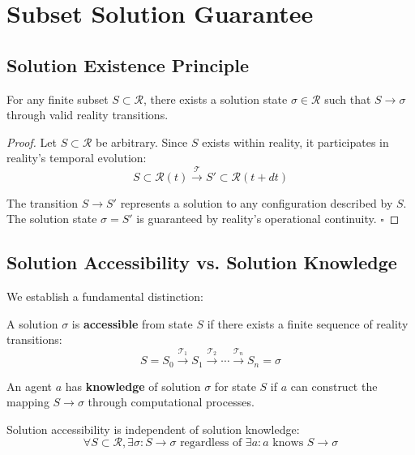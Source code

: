\documentclass{article}
\begin{document}
\section{Subset Solution Guarantee}

\subsection{Solution Existence Principle}
\begin{theorem}
For any finite subset $S \subset \mathcal{R}$, there exists a solution state $\sigma \in \mathcal{R}$ such that $S \rightarrow \sigma$ through valid reality transitions.
\end{theorem}

\begin{proof}
Let $S \subset \mathcal{R}$ be arbitrary. Since $S$ exists within reality, it participates in reality's temporal evolution:
$$S \subset \mathcal{R}(t) \stackrel{\mathcal{T}}{\rightarrow} S' \subset \mathcal{R}(t+dt)$$

The transition $S \rightarrow S'$ represents a solution to any configuration described by $S$. The solution state $\sigma = S'$ is guaranteed by reality's operational continuity. $\square$
\end{proof}

\subsection{Solution Accessibility vs. Solution Knowledge}
We establish a fundamental distinction:

\begin{definition}
A solution $\sigma$ is \textbf{accessible} from state $S$ if there exists a finite sequence of reality transitions:
$$S = S_0 \stackrel{\mathcal{T}_1}{\rightarrow} S_1 \stackrel{\mathcal{T}_2}{\rightarrow} \cdots \stackrel{\mathcal{T}_n}{\rightarrow} S_n = \sigma$$
\end{definition}

\begin{definition}
An agent $a$ has \textbf{knowledge} of solution $\sigma$ for state $S$ if $a$ can construct the mapping $S \rightarrow \sigma$ through computational processes.
\end{definition}

\begin{theorem}
Solution accessibility is independent of solution knowledge:
$$\forall S \subset \mathcal{R}, \exists \sigma: S \rightarrow \sigma \text{ regardless of } \exists a: a \text{ knows } S \rightarrow \sigma$$
\end{theorem}
\end{document}
